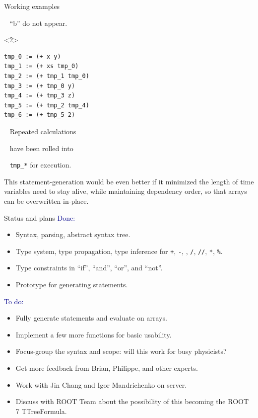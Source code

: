 \documentclass{beamer}
\begin{document}
\begin{frame}[fragile]{Working examples}
\begin{minipage}[t][12cm][t]{\textwidth}
\begin{onlyenv}
\mbox{ } \hfill ``b'' do not appear.

\vspace{6 cm}
\end{onlyenv}
\begin{onlyenv}<2>
\begin{lstlisting}[basicstyle=\ttfamily\small]
tmp_0 := (+ x y)
tmp_1 := (+ xs tmp_0)
tmp_2 := (+ tmp_1 tmp_0)
tmp_3 := (+ tmp_0 y)
tmp_4 := (+ tmp_3 z)
tmp_5 := (+ tmp_2 tmp_4)
tmp_6 := (+ tmp_5 2)
\end{lstlisting}
\vspace{-3 cm}
\normalsize
\mbox{ } \hfill Repeated calculations

\mbox{ } \hfill have been rolled into

\mbox{ } \hfill {\tt\small tmp\_*} for execution.

\vspace{2 cm}

This statement-generation would be even better if it minimized the length of time variables need to stay alive, while maintaining dependency order, so that arrays can be overwritten in-place.
\end{onlyenv}
\end{minipage}
\end{frame}

\begin{frame}{Status and plans}
\vspace{0.3 cm}
\textcolor{darkblue}{Done:}
\begin{itemize}
\item Syntax, parsing, abstract syntax tree.
\item Type system, type propagation, type inference for {\tt +}, {\tt -}, {\tt *}, {\tt /}, {\tt //}, {\tt **}, {\tt \%}.
\item Type constraints in ``if'', ``and'', ``or'', and ``not''.
\item Prototype for generating statements.
\end{itemize}

\vfill
\textcolor{darkblue}{To do:}
\begin{itemize}
\item Fully generate statements and evaluate on arrays.
\item Implement a few more functions for basic usability.
\item Focus-group the syntax and scope: will this work for busy physicists?
\item Get more feedback from Brian, Philippe, and other experts.
\item Work with Jin Chang and Igor Mandrichenko on server.
\item Discuss with ROOT Team about the possibility of this becoming the ROOT 7 TTreeFormula.
\end{itemize}
\end{frame}
\end{document}

